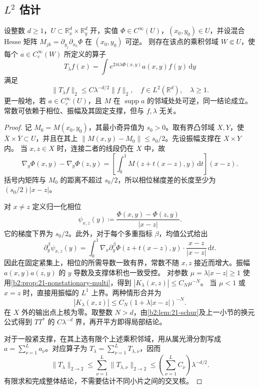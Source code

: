\subsection{\texorpdfstring{\(L^2\)}{L2} 估计}
\label{b2:subsec:210403}

\begin{theorem}[非退化振荡算子的局部 \(L^2\) 估计]\label{b2:thm:21-oscillatory-l2}
设整数 \(d\ge1\)，\(U\subset\mathbb R^d_x\times\mathbb R^d_y\) 开，实值 \(\Phi\in C^\infty(U)\)，\((x_0,y_0)\in U\)，并设混合 Hesse 矩阵
\(M_{jk}=\partial_{y_j}\partial_{x_k}\Phi\) 在 \((x_0,y_0)\) 可逆。
则存在该点的乘积邻域 \(W\Subset U\)，使每个 \(a\in C_c^\infty(W)\) 所定义的算子
\[
 T_\lambda f(x)=\int e^{2\pi\mathrm i\lambda\Phi(x,y)}a(x,y)f(y)\,\mathrm dy
\]
满足
\[
 \|T_\lambda f\|_2\le C\lambda^{-d/2}\|f\|_2,
 \quad f\in L^2(\mathbb R^d),\quad\lambda\ge1.
\]
更一般地，若 \(a\in C_c^\infty(U)\)，且 \(M\) 在 \(\operatorname{supp}a\) 的邻域处处可逆，同一结论成立。常数可依赖于相位、振幅及其固定支撑，但与 \(f,\lambda\) 无关。
\end{theorem}
\begin{proof}
记 \(M_0=M(x_0,y_0)\)，其最小奇异值为 \(s_0>0\)。取有界凸邻域 \(X,Y\)，使
\(\overline X\times\overline Y\subset U\)，并且在其上
\(\|M(x,y)-M_0\|\le s_0/2\)。先设振幅支撑在 \(X\times Y\) 内。
当 \(x,z\in X\) 时，连接二者的线段仍在 \(X\) 中，故
\[
 \nabla_y\Phi(x,y)-\nabla_y\Phi(z,y)
 =\left[\int_0^1 M(z+t(x-z),y)\,\mathrm dt\right](x-z).
\]
括号内矩阵与 \(M_0\) 的距离不超过 \(s_0/2\)，所以相位梯度差的长度至少为 \((s_0/2)|x-z|\)。

对 \(x\ne z\) 定义归一化相位
\[
 \psi_{x,z}(y)\coloneqq
 \frac{\Phi(x,y)-\Phi(z,y)}{|x-z|}.
\]
它的梯度下界为 \(s_0/2\)。此外，对于每个多重指标 \(\beta\)，均值公式给出
\[
 \partial_y^\beta\psi_{x,z}(y)
 =\int_0^1\nabla_x\partial_y^\beta\Phi(z+t(x-z),y)
       \cdot\frac{x-z}{|x-z|}\,\mathrm dt.
\]
因此在固定紧集上，相位的所需导数一致有界，常数不随 \(x,z\) 接近而增大。振幅
\(a(x,y)\overline{a(z,y)}\) 的 \(y\) 导数及支撑体积也一致受控。
对参数 \(\mu=\lambda|x-z|\ge1\) 使用\cref{b2:prop:21-nonstationary-multi}，得到
\( |K_\lambda(x,z)|\le C_N\mu^{-N}\)。
当 \(\mu<1\) 或 \(x=z\) 时，直接用振幅的 \(L^1\) 上界。两种情形合并为
\[
 |K_\lambda(x,z)|\le C_N(1+\lambda|x-z|)^{-N}.
\]
在 \(X\) 外的输出点上核为零。取整数 \(N>d\)，由\cref{b2:lem:21-schur}及上一小节的换元公式得到 \(TT^*\) 的 \(C\lambda^{-d}\) 界，再开平方即得局部结论。

对于一般紧支撑，在其上选有限个上述乘积邻域，用从属光滑分割写成
\(a=\sum_{\nu=1}^L a_\nu\)。对应算子为
\(T_\lambda=\sum_{\nu=1}^L T_{\lambda,\nu}\)，因而
\[
 \|T_\lambda\|_{2\to2}
 \le\sum_{\nu=1}^L\|T_{\lambda,\nu}\|_{2\to2}
 \le\left(\sum_{\nu=1}^L C_\nu\right)\lambda^{-d/2}.
\]
有限求和完成整体结论，不需要估计不同小片之间的交叉核。
\end{proof}

